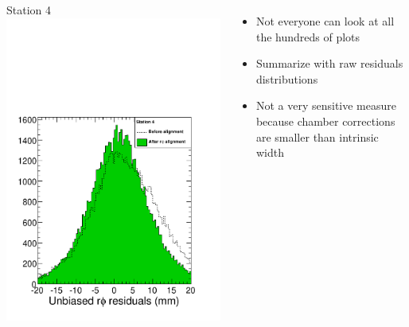 \documentclass[compress]{beamer}
\begin{document}
\begin{frame}
\begin{columns}
\vspace{0.5 cm}
Station 4
\includegraphics[width=\linewidth]{residuals_station4.pdf}

\begin{itemize}
\item Not everyone can look at all the hundreds of plots
\item Summarize with raw residuals distributions
\item Not a very sensitive measure because chamber corrections are
  smaller than intrinsic width
\end{itemize}
\end{columns}

\end{frame}
\end{document}
